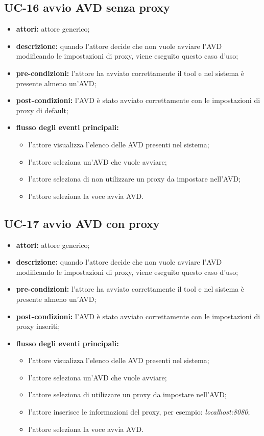 \subsection*{UC-16 avvio AVD senza proxy}\label{subsec:uc-16-avvio-avd-senza-proxy}
\begin{itemize}
    \item \textbf{attori:} attore generico;
    \item \textbf{descrizione:} quando l'attore decide che non vuole avviare l'AVD modificando le impostazioni di proxy, viene eseguito questo caso d'uso;
    \item \textbf{pre-condizioni:} l'attore ha avviato correttamente il tool e nel sistema è presente almeno un'AVD;
    \item \textbf{post-condizioni:} l'AVD è stato avviato correttamente con le impostazioni di proxy di default;
    \item \textbf{flusso degli eventi principali:}
    \begin{itemize}
        \item l'attore visualizza l'elenco delle AVD presenti nel sistema;
        \item l'attore seleziona un'AVD che vuole avviare;
        \item l'attore seleziona di non utilizzare un proxy da impostare nell'AVD;
        \item l'attore seleziona la voce avvia AVD.
    \end{itemize}
\end{itemize}
\subsection*{UC-17 avvio AVD con proxy}\label{subsec:uc-16-avvio-avd-con-proxy}
\begin{itemize}
    \item \textbf{attori:} attore generico;
    \item \textbf{descrizione:} quando l'attore decide che non vuole avviare l'AVD modificando le impostazioni di proxy, viene eseguito questo caso d'uso;
    \item \textbf{pre-condizioni:} l'attore ha avviato correttamente il tool e nel sistema è presente almeno un'AVD;
    \item \textbf{post-condizioni:} l'AVD è stato avviato correttamente con le impostazioni di proxy inseriti;
    \item \textbf{flusso degli eventi principali:}
    \begin{itemize}
        \item l'attore visualizza l'elenco delle AVD presenti nel sistema;
        \item l'attore seleziona un'AVD che vuole avviare;
        \item l'attore seleziona di utilizzare un proxy da impostare nell'AVD;
        \item l'attore inserisce le informazioni del proxy, per esempio: \textit{localhost:8080};
        \item l'attore seleziona la voce avvia AVD.
    \end{itemize}
\end{itemize}
